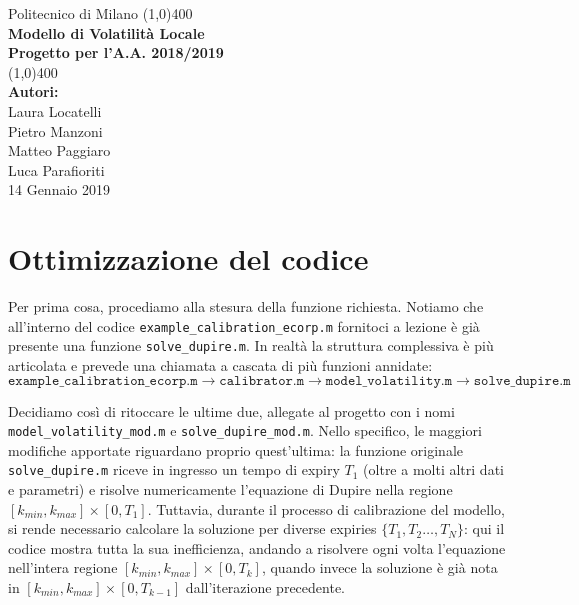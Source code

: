 \documentclass[11pt]{article}
\begin{document}
\begin{titlepage}
\begin{center}
\vspace*{1cm}
\Large{Politecnico di Milano}
\vfill
\line(1,0){400}\\[1mm]
\huge{\textbf{Modello di Volatilità Locale\\}}
\vspace*{1cm}
\Large{\textbf{Progetto per l'A.A. 2018/2019}}\\[1mm]
\line(1,0){400}\\
\vfill
\textbf{Autori:}\\
Laura Locatelli\\
Pietro Manzoni\\
Matteo Paggiaro\\
Luca Parafioriti\\
\vspace*{2cm}
14 Gennaio 2019
\end{center}
\end{titlepage}

\section{Ottimizzazione del codice}

Per prima cosa, procediamo alla stesura della funzione richiesta. Notiamo che all'interno del codice \texttt{example\_calibration\_ecorp.m} fornitoci a lezione è già presente una funzione \texttt{solve\_dupire.m}. In realtà la struttura complessiva è più articolata e prevede una chiamata a cascata di più funzioni annidate:
\
\begin{equation*}
	\texttt{example\_calibration\_ecorp.m} \rightarrow
	\texttt{calibrator.m} \rightarrow
	\texttt{model\_volatility.m}\rightarrow
	\texttt{solve\_dupire.m}
\end{equation*}

Decidiamo così di ritoccare le ultime due, allegate al progetto con i nomi \texttt{model\_volatility\_mod.m} e \texttt{solve\_dupire\_mod.m}. Nello specifico, le maggiori modifiche apportate riguardano proprio quest'ultima: la funzione originale \texttt{solve\_dupire.m} riceve in ingresso un tempo di expiry $T_1$ (oltre a molti altri dati e parametri) e risolve numericamente l'equazione di Dupire nella regione $[k_{min},k_{max}]\times[0,T_1]$. Tuttavia, durante il processo di calibrazione del modello, si rende necessario calcolare la soluzione per diverse expiries $\{T_1, T_2\dots, T_N\}$: qui il codice mostra tutta la sua inefficienza, andando a risolvere ogni volta l'equazione nell'intera regione $[k_{min},k_{max}]\times[0,T_k]$, quando invece la soluzione è già nota in $[k_{min},k_{max}]\times[0,T_{k-1}]$ dall'iterazione precedente.\\
\end{document}
